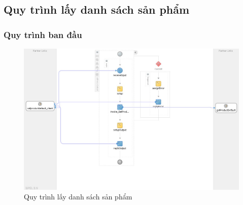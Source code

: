 \subsection{Quy trình lấy danh sách sản phẩm}

\subsubsection*{Quy trình ban đầu}
\begin{figure}[!htp]
    \centering
    \includegraphics[width=12cm]{img/bpel/productDefault.jpg}
    \newline
    \caption{Quy trình lấy danh sách sản phẩm}
\end{figure}

